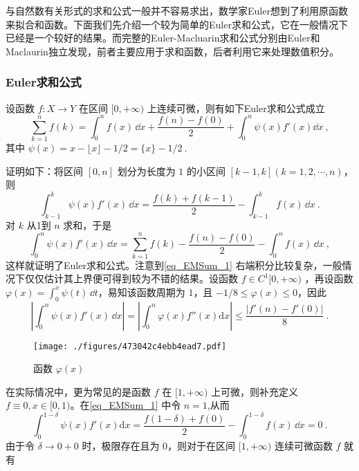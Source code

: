 
与自然数有关形式的求和公式一般并不容易求出，数学家Euler想到了利用原函数来拟合和函数。下面我们先介绍一个较为简单的Euler求和公式，它在一般情况下已经是一个较好的结果。而完整的Euler-Macluarin求和公式分别由Euler和Maclaurin独立发现，前者主要应用于求和函数，后者利用它来处理数值积分。

\subsubsection{Euler求和公式}

\begin{theorem}{}
设函数 $f:X\to Y$ 在区间 $[0,+\infty)$ 上连续可微，则有如下Euler求和公式成立	
        \begin{equation}\label{eq_EMSum_1} 
            \sum_{k=1}^{n}f(k)=\int_{0}^{n}f(x)\,\dd x
            +\frac{f(n)-f(0)}{2}+\int_{0}^{n}\psi(x)f'(x)\dd x~,
        \end{equation}
    其中 $\psi(x)=x-\lfloor x \rfloor-1/2=\{x\}-1/2~.$
\end{theorem}
证明如下：将区间 $[0,n]$ 划分为长度为 $1$ 的小区间 $[k-1,k](k=1,2,\cdots,n)$，则
​\[
    \int_{k-1}^{k}\psi(x)f'(x)\,\dd x
    =\frac{f(k)+f(k-1)}{2}-\int_{k-1}^{k}f(x)\,\dd x~.
\]
​对 $k$ 从1到 $n$ 求和，于是
​\[
    \int_{0}^{n}\psi(x)f'(x)\,\dd x
    =\sum_{k=1}^{n}f(k)-\frac{f(n)-f(0)}{2}-\int_{0}^{n}f(x)\,\dd x~,
\]
这样就证明了Euler求和公式。注意到\autoref{eq_EMSum_1}  右端积分比较复杂，一般情况下仅仅估计其上界便可得到较为不错的结果。设函数 $f\in{C^1[0,+\infty)}$ ，再设函数 $\varphi(x)=\displaystyle{\int_{0}^{x}\psi(t)\,\dd t}$，易知该函数周期为 $1$，且
 $-1/8\leqslant\varphi(x)\leqslant 0$，因此
\[
    \left|\int_{0}^{n}\psi(x)f'(x)\,\dd x\right|
    =\left|\int_{0}^{n}\varphi(x)f''(x)\mathrm{d}x\right|
    \leqslant\frac{|f'(n)-f'(0)|}{8}~.
\]
\begin{figure}[ht]
\centering
\texttt{[image: ./figures/473042c4ebb4ead7.pdf]}
\caption{函数 $\varphi(x)$} \label{fig_EMSum_1}
\end{figure}
在实际情况中，更为常见的是函数 $f$ 在 $[1,+\infty)$ 上可微，则补充定义 $ f\equiv 0,x\in[0,1)$。在\autoref{eq_EMSum_1}  中令 $n=1$,从而
\[
    \int_{0}^{1-\delta}\psi(x)f'(x)\mathrm{d}x
    =\frac{f(1-\delta)+f(0)}{2}-\int_{0}^{1-\delta}f(x)\,\dd x=0~.
\]
由于令 $\delta\to0+0$ 时，极限存在且为 $0$，则对于在区间 $[1,+\infty)$ 连续可微函数 $f$ 就有
